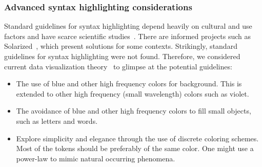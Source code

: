 \documentclass{article}
\begin{document}
\subsubsection{Advanced syntax highlighting considerations}
Standard guidelines for syntax highlighting
depend heavily on cultural and use factors
and have scarce scientific studies~\cite{stack}.
There are informed projects such as Solarized~\cite{solazired},
which present solutions for some contexts.
Strikingly, standard guidelines for syntax highlighting were not found.
Therefore, we considered current data visualization
theory~\cite{dv1,dv2,dv3,dv4} to glimpse at the potential guidelines:
\begin{itemize}
  \item The use of blue and other high frequency colors for
  background.
  This is extended to other high frequency (small wavelength)
  colors such as violet.
  \item The avoidance of blue and other high frequency
  colors to fill small objects, such as letters and words.
  \item Explore simplicity and elegance through the use of discrete
  coloring schemes. Most of the tokens should be preferably of
  the same color.
  One might use a power-law to mimic natural occurring phenomena.


\end{itemize}
\end{document}

